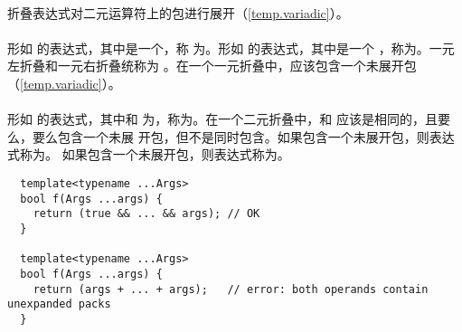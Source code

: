 \paragraph{} %
折叠表达式对二元运算符上的包进行展开（\ref{temp.variadic}）。

  \synprd{\tm{+ \ \ - \ \ * \ \ / \ \ \% \ \ ^ \ \ \& \ \ | \ \ \tl{}\tl \ \ \tg{}\tg}}
  \synprd{\tm{+= \ -= \ *= \ /= \ \%= \ ^= \ \&= \ |= \ \tl{}\tl{}= \tg{}\tg{}= =}}

\paragraph{} %
形如  的表达式，其中是一个，称
为。形如  的表达式，其中是一个
，称为。一元左折叠和一元右折叠统称为
。在一个一元折叠中，应该包含一个未展开包
（\ref{temp.variadic}）。

\paragraph{} %
形如    的表达式，其中和
为，称为。在一个二元折叠中，和
应该是相同的，且要么，要么包含一个未展
开包，但不是同时包含。如果包含一个未展开包，则表达式称为。
如果包含一个未展开包，则表达式称为。

\begin{example}
  \begin{lstlisting}
  template<typename ...Args>
  bool f(Args ...args) {
    return (true && ... && args); // OK
  }

  template<typename ...Args>
  bool f(Args ...args) {
    return (args + ... + args);   // error: both operands contain unexpanded packs
  }
  \end{lstlisting}
\end{example}
